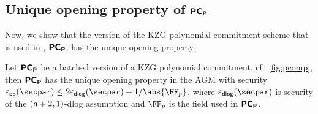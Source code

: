 \subsection{Unique opening property of $\bm{\mathsf{PC}}_{\bm{\mathsf{P}}}$}
Now, we show that the version of the KZG polynomial
commitment scheme that is used in \plonk{}, $\bm{\mathsf{PC}}_{\bm{\mathsf{P}}}$, has the unique opening
property.

\begin{lemma}
\label{lem:pcomp_op}
Let $\bm{\mathsf{PC}}_{\bm{\mathsf{P}}}$ be a batched version of a KZG polynomial commitment,
cf.~\cref{fig:pcomp}, then $\bm{\mathsf{PC}}_{\bm{\mathsf{P}}}$ has the unique opening property  
 in the AGM with security
$\epsop(\secpar) \leq 2 \epsdlog(\secpar) + \infrac{1}{\abs{\FF_p}}$, where
$\epsdlog(\secpar)$ is security of the $(\mathsf{n} + 2, 1)$-dlog assumption and
$\FF_p$ is the field used in $\bm{\mathsf{PC}}_{\bm{\mathsf{P}}}$.\end{lemma}
